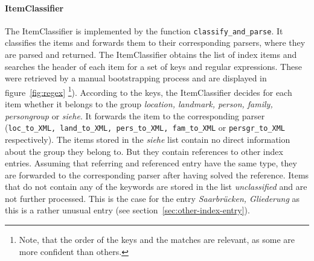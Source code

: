 \paragraph{ItemClassifier}
The ItemClassifier is implemented by the function \texttt{classify\_and\_parse}. It classifies the items and forwards them to their corresponding parsers, where they are parsed and returned. The ItemClassifier obtains the list of index items and searches the header of each item for a set of keys and regular expressions. These were retrieved by a manual bootstrapping process and are displayed in figure~\ref{fig:regex} \footnote{Note, that the order of the keys and the matches are relevant, as some are more confident than others.}). According to the keys, the ItemClassifier decides for each item whether it belongs to the group \textit{location, landmark, person, family, persongroup} or \textit{siehe}. It forwards the item to the corresponding parser (\texttt{loc\_to\_XML, land\_to\_XML, pers\_to\_XML, fam\_to\_XML} or \texttt{persgr\_to\_XML} respectively). The items stored in the \textit{siehe} list contain no direct information about the group they belong to. But they contain references to other index entries. Assuming that referring and referenced entry have the same type, they are forwarded to the corresponding parser after having solved the reference. Items that do not contain any of the keywords are stored in the list \textit{unclassified} and are not further processed. This is the case for the entry \textit{Saarbrücken, Gliederung} as this is a rather unusual entry (see section~\ref{sec:other-index-entry}).

